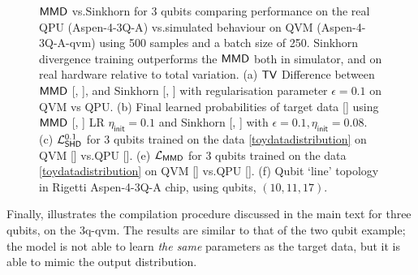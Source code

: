 \begin{figure}
\begin{subfigure}[t]{0.31\textwidth}
        \vskip 5pt
        \caption{}
        \label{subfig:3_qubit_topology_aspen_4_3q_a}
    \end{subfigure}
    \caption{$\operatorname{\textsf{MMD}}$ vs.\@ Sinkhorn for 3 qubits comparing performance on the real QPU ({\selectfont Aspen-4-3Q-A}) vs.\@ simulated behaviour on QVM ({\selectfont Aspen-4-3Q-A-qvm}) using 500 samples and a batch size of 250. Sinkhorn divergence training outperforms the $\operatorname{\textsf{MMD}}$ both in simulator, and on real hardware relative to total variation. (a) $\operatorname{\textsf{TV}}$ Difference between $\operatorname{\textsf{MMD}}$ [\crule[ForestGreen]{0.2cm}{0.2cm}, \crule[yellow]{0.2cm}{0.2cm}], and Sinkhorn [\crule[blue]{0.2cm}{0.2cm}, \crule[cyan]{0.2cm}{0.2cm}] with regularisation parameter $\epsilon = 0.1$ on QVM vs QPU. (b) Final learned probabilities of target data [\crule[black]{0.2cm}{0.2cm}] using $\operatorname{\textsf{MMD}}$ [\crule[ForestGreen]{0.2cm}{0.2cm}, \crule[yellow]{0.2cm}{0.2cm}] LR $\eta_{\mathsf{init}} = 0.1$ and Sinkhorn [\crule[blue]{0.2cm}{0.2cm}, \crule[cyan]{0.2cm}{0.2cm}] with $\epsilon = 0.1, \eta_{\mathsf{init}} = 0.08$. (c) $\mathcal{L}^{0.1}_{\operatorname{\textsf{SHD}}}$ for 3 qubits trained on the data \eqref{toydatadistribution} on QVM  [\crule[cyan]{0.2cm}{0.2cm}] vs.\@ QPU  [\crule[blue]{0.2cm}{0.2cm}]. (e) $\mathcal{L}_{\operatorname{\textsf{MMD}}}$ for 3 qubits trained on the data \eqref{toydatadistribution} on QVM  [\crule[yellow]{0.2cm}{0.2cm}] vs.\@ QPU  [\crule[ForestGreen]{0.2cm}{0.2cm}]. (f) Qubit `line' topology in Rigetti {\selectfont Aspen-4-3Q-A} chip, using qubits, $(10, 11, 17)$. }\label{fig:MMDvSinkvStein3_real}
\end{figure}

Finally,  illustrates the compilation procedure discussed in the main text for three qubits, on the {\selectfont 3q-qvm}. The results are similar to that of the two qubit example; the model is not able to learn \textit{the same} parameters as the target data, but it is able to mimic the output distribution.


